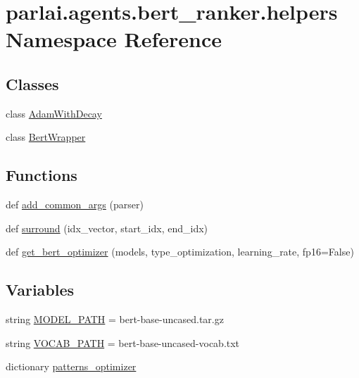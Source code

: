 \hypertarget{namespaceparlai_1_1agents_1_1bert__ranker_1_1helpers}{}\section{parlai.\+agents.\+bert\+\_\+ranker.\+helpers Namespace Reference}
\label{namespaceparlai_1_1agents_1_1bert__ranker_1_1helpers}
\subsection*{Classes}
\begin{DoxyCompactItemize}
\item 
class \hyperlink{classparlai_1_1agents_1_1bert__ranker_1_1helpers_1_1AdamWithDecay}{Adam\+With\+Decay}
\item 
class \hyperlink{classparlai_1_1agents_1_1bert__ranker_1_1helpers_1_1BertWrapper}{Bert\+Wrapper}
\end{DoxyCompactItemize}
\subsection*{Functions}
\begin{DoxyCompactItemize}
\item 
def \hyperlink{namespaceparlai_1_1agents_1_1bert__ranker_1_1helpers_ac2e926c3aba3a62be09e2c37dffcaee2}{add\+\_\+common\+\_\+args} (parser)
\item 
def \hyperlink{namespaceparlai_1_1agents_1_1bert__ranker_1_1helpers_ae5621255d8851c9628c116cb6db4c28c}{surround} (idx\+\_\+vector, start\+\_\+idx, end\+\_\+idx)
\item 
def \hyperlink{namespaceparlai_1_1agents_1_1bert__ranker_1_1helpers_a7a144c1f6c9af7925e754b9b61c0e6fb}{get\+\_\+bert\+\_\+optimizer} (models, type\+\_\+optimization, learning\+\_\+rate, fp16=False)
\end{DoxyCompactItemize}
\subsection*{Variables}
\begin{DoxyCompactItemize}
\item 
string \hyperlink{namespaceparlai_1_1agents_1_1bert__ranker_1_1helpers_a596044b27f3659ebe25c250dca2f15f7}{M\+O\+D\+E\+L\+\_\+\+P\+A\+TH} = \textquotesingle{}bert-\/base-\/uncased.\+tar.\+gz\textquotesingle{}
\item 
string \hyperlink{namespaceparlai_1_1agents_1_1bert__ranker_1_1helpers_a88c47b25646aed4d2d140a159443bb7c}{V\+O\+C\+A\+B\+\_\+\+P\+A\+TH} = \textquotesingle{}bert-\/base-\/uncased-\/vocab.\+txt\textquotesingle{}
\item 
dictionary \hyperlink{namespaceparlai_1_1agents_1_1bert__ranker_1_1helpers_aebda7127ff111489042a68edcd62830f}{patterns\+\_\+optimizer}
\end{DoxyCompactItemize}


